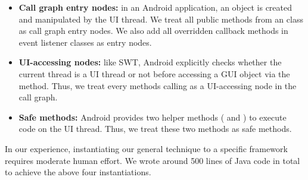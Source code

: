 

\begin{itemize}

\item \textbf{Call graph entry nodes: } in an Android application,
an  object is created and manipulated by the UI thread. We treat
all public methods from an  class as call graph entry nodes.
We also add all overridden callback methods in event listener classes as entry nodes.

\item \textbf{UI-accessing nodes: } like SWT, Android explicitly checks whether
the current thread is a UI thread or not before accessing a GUI object via
the  method.
Thus, we treat every methods calling  as a UI-accessing node
in the call graph.

\item \textbf{Safe methods: } Android provides two helper methods (
and ) to execute code on the UI thread. Thus, we treat
these two methods as safe methods.

\end{itemize}


In our experience, instantiating our general technique to  a specific framework
requires moderate human effort. We wrote around 500 lines of Java code in total to achieve
the above four instantiations.
